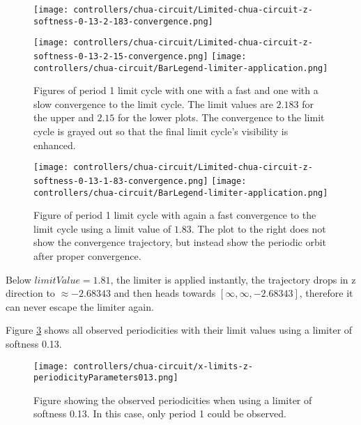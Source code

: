 \documentclass[main]{subfiles}
\begin{document}
\begin{figure}[H]
\centering
\texttt{[image: controllers/chua-circuit/Limited-chua-circuit-z-softness-0-13-2-183-convergence.png]}

\texttt{[image: controllers/chua-circuit/Limited-chua-circuit-z-softness-0-13-2-15-convergence.png]}
\texttt{[image: controllers/chua-circuit/BarLegend-limiter-application.png]}
\caption[Figure of period 1 limit cycle]{Figures of period 1 limit cycle with one with a fast and one with a slow convergence to the limit cycle. The limit values are \(2.183\) for the upper and \(2.15\) for the lower plots. The convergence to the limit cycle is grayed out so that the final limit cycle's visibility is enhanced.}
\label{figure:z-1-limit-cycle-ctrajectories}
\end{figure}

\begin{figure}[H]
\centering
\texttt{[image: controllers/chua-circuit/Limited-chua-circuit-z-softness-0-13-1-83-convergence.png]}
\texttt{[image: controllers/chua-circuit/BarLegend-limiter-application.png]}
\caption[Figure of another period 1 limit cycle]{Figure of period 1 limit cycle with again a fast convergence to the limit cycle using a limit value of \(1.83\). The plot to the right does not show the convergence trajectory, but instead show the periodic orbit after proper convergence.}
\label{figure:z-fast-1-limit-cycle-trajectory}
\end{figure}

Below \(limitValue = 1.81\), the limiter is applied instantly, the trajectory drops in z direction to \(\approx-2.68343\) and then heads towards \([\infty,\infty,-2.68343]\), therefore it can never escape the limiter again.

Figure \ref{figure:x-limits-z-periodicityParameters013} shows all observed periodicities with their limit values using a limiter of softness 0.13. 
\begin{figure}[H]
\centering
\texttt{[image: controllers/chua-circuit/x-limits-z-periodicityParameters013.png]}
\caption[Figure of observed periodicities with a x-limiting z 0.13 limiter]{Figure showing the observed periodicities when using a limiter of softness 0.13. In this case, only period 1 could be observed.}
\label{figure:x-limits-z-periodicityParameters013}
\end{figure}
\end{document}
